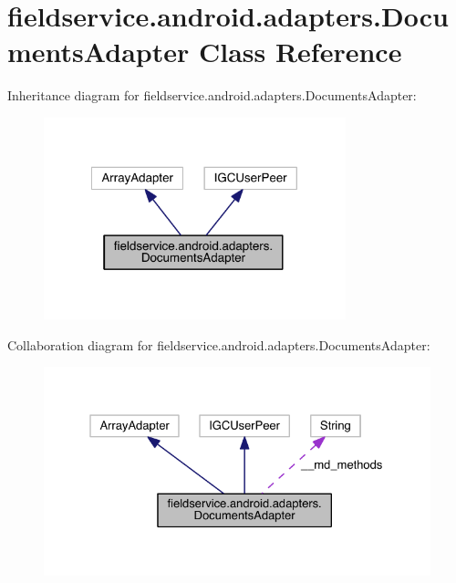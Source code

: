 \hypertarget{classfieldservice_1_1android_1_1adapters_1_1_documents_adapter}{\section{fieldservice.\+android.\+adapters.\+Documents\+Adapter Class Reference}
\label{classfieldservice_1_1android_1_1adapters_1_1_documents_adapter}
}


Inheritance diagram for fieldservice.\+android.\+adapters.\+Documents\+Adapter\+:
\nopagebreak
\begin{figure}[H]
\begin{center}
\leavevmode
\includegraphics[width=248pt]{classfieldservice_1_1android_1_1adapters_1_1_documents_adapter__inherit__graph}
\end{center}
\end{figure}


Collaboration diagram for fieldservice.\+android.\+adapters.\+Documents\+Adapter\+:
\nopagebreak
\begin{figure}[H]
\begin{center}
\leavevmode
\includegraphics[width=327pt]{classfieldservice_1_1android_1_1adapters_1_1_documents_adapter__coll__graph}
\end{center}
\end{figure}
